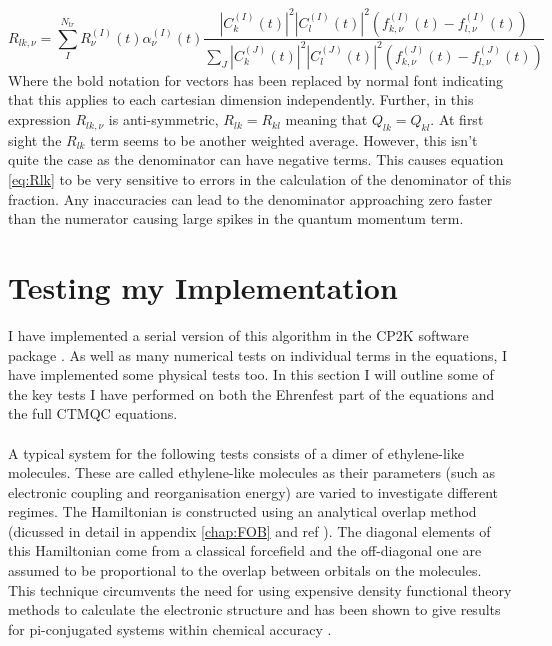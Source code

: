 \begin{equation}
  R_{lk, \nu} = \sum_{I}^{N_{tr}} R_{\nu}^{(I)}(t) \alpha_{\nu}^{(I)}(t) \frac{|C_{k}^{(I)}(t)|^2 |C_{l}^{(I)}(t)|^2 \left( f_{k, \nu}^{(I)}(t) - f_{l, \nu}^{(I)}(t) \right)}{\sum_{J} |C_{k}^{(J)}(t)|^2 |C_{l}^{(J)}(t)|^2 \left( f_{k, \nu}^{(J)}(t) - f_{l, \nu}^{(J)}(t) \right)}
  \label{eq:Rlk}
\end{equation}
Where the bold notation for vectors has been replaced by normal font indicating that this applies to each cartesian dimension independently. Further, in this expression $R_{lk, \nu}$ is anti-symmetric, $R_{lk} = R_{kl}$ meaning that $Q_{lk} = Q_{kl}$. At first sight the $R_{lk}$ term seems to be another weighted average. However, this isn't quite the case as the denominator can have negative terms. This causes equation \eqref{eq:Rlk} to be very sensitive to errors in the calculation of the denominator of this fraction. Any inaccuracies can lead to the denominator approaching zero faster than the numerator causing large spikes in the quantum momentum term.

\section{Testing my Implementation}
I have implemented a serial version of this algorithm in the CP2K software package \cite{CP2K}. As well as many numerical tests on individual terms in the equations, I have implemented some physical tests too. In this section I will outline some of the key tests I have performed on both the Ehrenfest part of the equations and the full CTMQC equations.
\\\\
A typical system for the following tests consists of a dimer of ethylene-like molecules. These are called ethylene-like molecules as their parameters (such as electronic coupling and reorganisation energy) are varied to investigate different regimes. The Hamiltonian is constructed using an analytical overlap method (dicussed in detail in appendix \ref{chap:FOB} and ref \cite{spencer_fob-sh:_2016}). The diagonal elements of this Hamiltonian come from a classical forcefield and the off-diagonal one are assumed to be proportional to the overlap between orbitals on the molecules. This technique circumvents the need for using expensive density functional theory methods to calculate the electronic structure and has been shown to give results for pi-conjugated systems within chemical accuracy \cite{spencer_fob-sh:_2016}.
